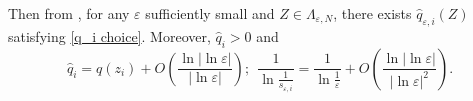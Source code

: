\documentclass[12pt,reqno]{amsart}
\numberwithin{equation}{section}
\theoremstyle{definition}
\theoremstyle{remark}
\begin{document}
Then from \cite{Ku}, %
for any $ \varepsilon $ sufficiently small  and $ Z\in \Lambda_{\varepsilon, N} $, there exists $ \hat{q}_{\varepsilon,i}(Z) $ satisfying \eqref{q_i choice}. Moreover, $ \hat{q}_i>0 $ and %
\begin{equation}\label{2000}
\hat{q}_i=q(z_i)+O\left (\frac{\ln|\ln\varepsilon|}{|\ln\varepsilon|}\right );\ \ \frac{1}{\ln\frac{1}{s_{\varepsilon,i}}}=\frac{1}{\ln\frac{1}{\varepsilon}}+O\left( \frac{\ln|\ln\varepsilon|}{|\ln\varepsilon|^2}\right).
\end{equation}
\end{document}
